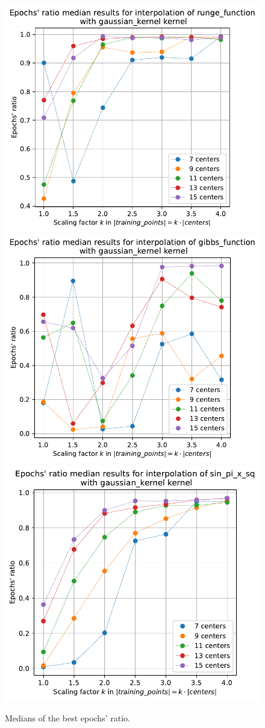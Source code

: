 \documentclass[12pt]{report} %
\begin{document}
\begin{figure}[H]
  {\includegraphics[height=.45\textwidth]
    {imagenes/experiments/1d/statistical_1d_full/medians_epochs_runge_function_gaussian_kernel.pdf}}
  {\includegraphics[height=.45\textwidth]
    {imagenes/experiments/1d/statistical_1d_full/gibbs_function/medians_epochs_gibbs_function_gaussian_kernel.pdf}}
  {\includegraphics[height=.45\textwidth]
    {imagenes/experiments/1d/statistical_1d_full/sin_pi_x_sq/medians_epochs_sin_pi_x_sq_gaussian_kernel.pdf}}
  \caption{Medians of the best epochs' ratio.}
  \label{fig:medians-epochs-statistic}
\end{figure}
\end{document}
